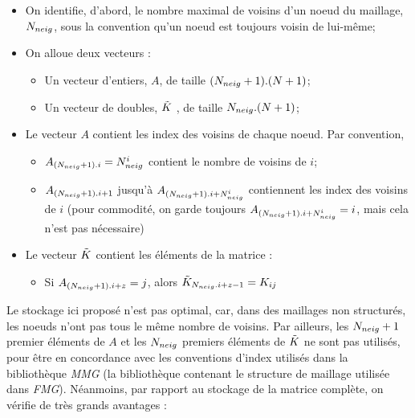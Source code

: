 
\begin{itemize}
	\item On identifie, d'abord, le nombre maximal de voisins d'un noeud du maillage, \(N_{neig}\), sous la convention qu'un noeud est toujours voisin de lui-même;
	\item On alloue deux vecteurs :  
	\begin{itemize}
		\item Un vecteur d'entiers, \(A\), de taille \((N_{neig}+1).(N+1)\);
		\item Un vecteur de doubles, \(\tilde{K}\) , de taille \(N_{neig}.(N+1)\);
	\end{itemize}
	\item Le vecteur \(A\) contient les index des voisins de chaque noeud. Par convention,
	\begin{itemize}
		\item \(A_{(N_{neig}+1).i} = N_{neig}^i\) contient le nombre de voisins de \(i\);
		\item \(A_{(N_{neig}+1).i+1}\) jusqu'à \(A_{(N_{neig}+1).i+N_{neig}^i}\) contiennent les index des voisins de \(i\) (pour commodité, on garde toujours \(A_{(N_{neig}+1).i+N_{neig}^i} = i\), mais cela n'est pas nécessaire)
	\end{itemize}
	\item Le vecteur \(\tilde{K}\) contient les éléments de la matrice : 
	\begin{itemize}
		\item Si \(A_{(N_{neig}+1).i + z} = j\), alors \(\tilde{K}_{N_{neig} . i + z - 1} = K_{ij}\)
	\end{itemize}
\end{itemize}

\indent Le stockage ici proposé n'est pas optimal, car, dans des maillages non structurés, les noeuds n'ont pas tous le même nombre de voisins. Par ailleurs, les \(N_{neig}+1\) premier éléments de \(A\) et les \(N_{neig}\) premiers éléments de \(\tilde{K}\) ne sont pas utilisés, pour être en concordance avec les conventions d'index utilisés dans la bibliothèque \emph{MMG} (la bibliothèque contenant le structure de maillage utilisée dans \emph{FMG}). Néanmoins, par rapport au stockage de la matrice complète, on vérifie de très grands avantages : 

